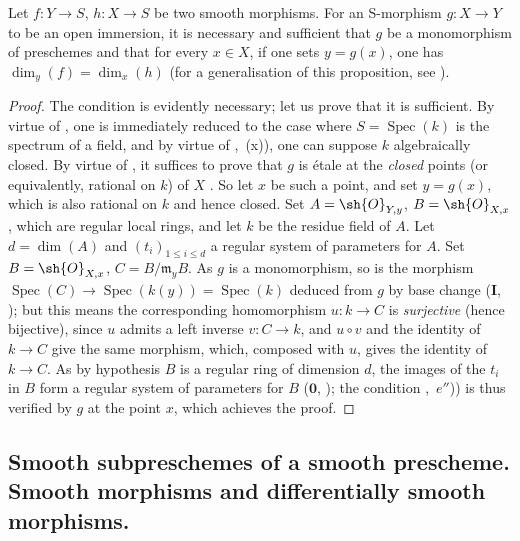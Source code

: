 \begin{proposition}[17.11.5]
\label{IV.17.11.5}
Let $f:Y\to S$, $h:X\to S$ be two smooth morphisms.
For an S-morphism $g:X\to Y$ to be an open immersion, it is necessary and sufficient that $g$ be a monomorphism of preschemes and that for every $x\in X$, if one sets $y=g(x)$, one has $\dim_y(f)=\dim_x(h)$ (for a generalisation of this proposition, see ).
\end{proposition}

\begin{proof}
The condition is evidently necessary; let us prove that it is sufficient.
By virtue of , one is immediately reduced to the case where $S=\operatorname{Spec}(k)$ is the spectrum of a field, and by virtue of ,~(x)), one can suppose $k$ algebraically closed.
By virtue of , it suffices to prove that $g$ is \'etale at the \emph{closed} points (or equivalently, rational on $k$) of $X$ .
So let $x$ be such a point, and set $y=g(x)$, which is also rational on $k$ and hence closed.
Set $A=\sh{O}_{Y,y}$, $B=\sh{O}_{X,x}$, which are regular local rings, and let $k$ be the residue field of $A$.
Let $d=\dim(A)$ and $(t_i)_{1\leq i\leq d}$ a regular system of parameters for $A$.
Set $B=\sh{O}_{X,x}$, $C=B/\mathfrak{m}_y B$.
As $g$ is a monomorphism, so is the morphism $\operatorname{Spec}(C)\to\operatorname{Spec}(k(y))=\operatorname{Spec}(k)$ deduced from $g$ by base change ($\mathbf{I}$, ); but this means the corresponding homomorphism $u:k\to C$ is \emph{surjective} (hence bijective), since $u$ admits a left inverse $v:C\to k$, and $u\circ v$ and the identity of $k\to C$ give the same morphism, which, composed with $u$, gives the identity of $k\to C$.
As by hypothesis $B$ is a regular ring of dimension $d$, the images of the $t_i$ in $B$ form a regular system of parameters for $B$ ($\mathbf{0}$, ); the condition ,~$e''$)) is thus verified by $g$ at the point $x$, which achieves the proof.
\end{proof}


\subsection{Smooth subpreschemes of a smooth prescheme. Smooth morphisms and differentially smooth morphisms.}
\label{subsection:IV.17.12}


